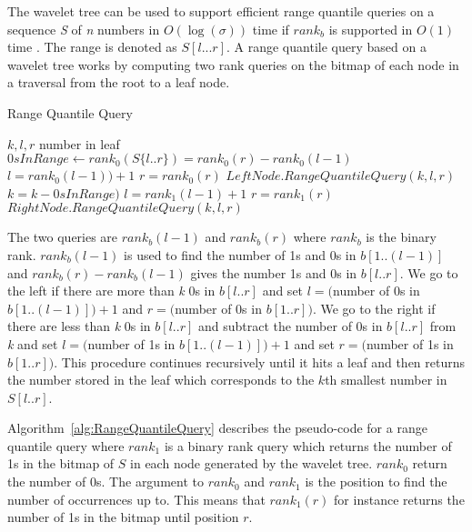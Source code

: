The wavelet tree can be used to support efficient range quantile queries on a sequence \textit{S} of \textit{n} numbers in $O(\log(\sigma))$ time if $rank_b$ is supported in $O(1)$ time \citep[Section 3]{RangeQuantileQueryWT}. 
The range is denoted as $S[l ... r]$.
A range quantile query based on a wavelet tree works by computing two rank queries on the bitmap of each node in a traversal from the root to a leaf node. 

\begin{algorithm}
\caption{Range Quantile Query}
\label{alg:RangeQuantileQuery}
\begin{algorithmic}
 {$k,l,r$}
	\State \Return number in leaf
\EndIf
\State $\textit{0}sInRange \gets rank_0(S \lbrace l..r \rbrace) = rank_0(r) - rank_0(l-1)$
	\State $l = rank_0(l-1))+1$
	\State $r = rank_0(r)$
	\State \Return $LeftNode.RangeQuantileQuery(k,l,r)$
\Else
	\State $k = k - \textit{0}sInRange)$
	\State $l = rank_1(l-1)+1$
	\State $r = rank_1(r)$
	\State \Return $RightNode.RangeQuantileQuery(k,l,r)$
\EndIf

\EndFunction
\end{algorithmic}
\end{algorithm}

The two queries are $rank_b(l-1)$ and $rank_b(r)$ where $rank_b$ is the binary rank.
$rank_b(l-1)$ is used to find the number of 1s and 0s in $b[1..(l-1)]$ and $rank_b(r) - rank_b(l-1)$ gives the number 1s and 0s in $b[l..r]$. 
We go to the left if there are more than \textit{k} 0s in $b[l..r]$ and set $l = ($number of 0s in $b[1..(l-1)])+1$ and $r=($number of 0s in $b[1..r])$. 
We go to the right if there are less than \textit{k} 0s in $b[l..r]$ and subtract the number of 0s in $b[l..r]$ from \textit{k} and set $l = ($number of 1s in $b[1..(l-1)])+1$ and set $r=($number of 1s in $b[1..r])$. 
This procedure continues recursively until it hits a leaf and then returns the number stored in the leaf which corresponds to the $k$th smallest number in $S[l..r]$.

Algorithm~\ref{alg:RangeQuantileQuery} describes the pseudo-code for a range quantile query where $rank_1$ is a binary rank query which returns the number of 1s in the bitmap of $S$ in each node generated by the wavelet tree. 
$rank_0$ return the number of 0s.
The argument to $rank_0$ and $rank_1$ is the position to find the number of occurrences up to.
This means that $rank_1(r)$ for instance returns the number of 1s in the bitmap until position $r$.

